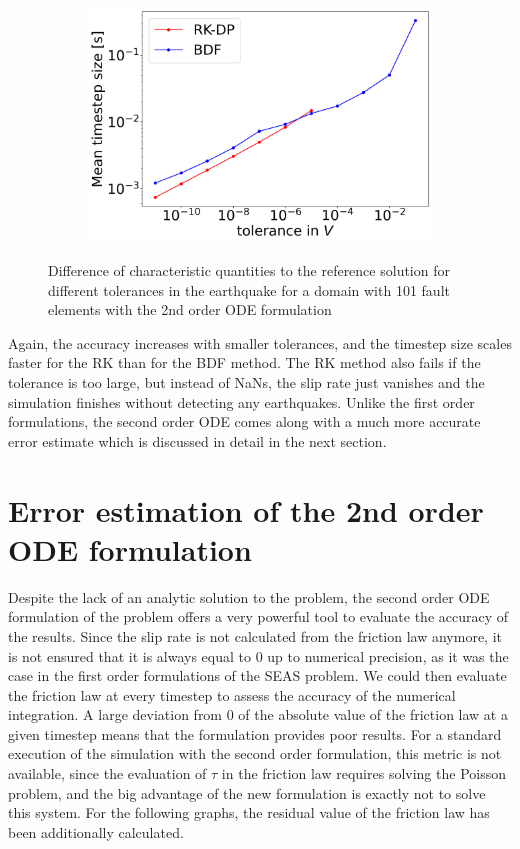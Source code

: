 \begin{figure}[H]
\begin{subfigure}[t]{0.32\textwidth}
		\includegraphics[width=1\textwidth]{images/TANDEMextendedODEDifferentTolerancesSize101_EQ_DT.png}
	\end{subfigure}
	\caption{Difference of characteristic quantities to the reference solution for different tolerances in the earthquake for a domain with 101 fault elements with the 2nd order ODE formulation}
	\label{fig:tolerancesEarthquake_extendedODE}
\end{figure}

Again, the accuracy increases with smaller tolerances, and the timestep size scales faster for the RK than for the BDF method. The RK method also fails if the tolerance is too large, but instead of NaNs, the slip rate just vanishes and the simulation finishes without detecting any earthquakes. Unlike the first order formulations, the second order ODE comes along with a much more accurate error estimate which is discussed in detail in the next section.




\section{Error estimation of the 2nd order ODE formulation}
\label{sec:Results_ErrorEstimate2ndOrderODE}
Despite the lack of an analytic solution to the problem, the second order ODE formulation of the problem offers a very powerful tool to evaluate the accuracy of the results. Since the slip rate is not calculated from the friction law anymore, it is not ensured that it is always equal to 0 up to numerical precision, as it was the case in the first order formulations of the SEAS problem. We could then evaluate the friction law at every timestep to assess the accuracy of the numerical integration. A large deviation from 0 of the absolute value of the friction law at a given timestep means that the formulation provides poor results. For a standard execution of the simulation with the second order formulation, this metric is not available, since the evaluation of $\tau$ in the friction law requires solving the Poisson problem, and the big advantage of the new formulation is exactly not to solve this system. For the following graphs, the residual value of the friction law has been additionally calculated. \\


